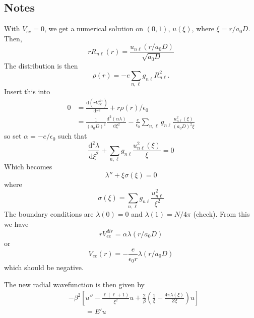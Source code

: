\documentclass[twocolumn]{article}
\begin{document}
\begin{large}
\subsection*{Notes}
With $V_{ee}=0$, we get a numerical solution on $(0,1)$, $u(\xi)$, where $\xi = r/a_0D$. Then,
\begin{equation}
    rR_{n\ell}(r) = \frac{u_{n\ell}(r/a_0D)}{\sqrt{a_0D}}
\end{equation}
The distribution is then 
\begin{equation}
    \rho(r) = -e\sum_{n,\ell}g_{n\ell}R_{n\ell}^2.
\end{equation}
Insert this into 
\begin{equation}
    \begin{split}
        0 &= \frac{\text{d}(rV_{ee}^{dir})}{\text{d}r^2} + r\rho(r)/\epsilon_0  \\ 
        &= \frac{1}{(a_0D)^2}\frac{\text{d}^2(\alpha\lambda)}{\text{d}\xi^2} - \frac{e}{\epsilon_0}\sum_{n,\ell}g_{n\ell}\frac{u_{n\ell}^2(\xi)}{(a_0D)^2\xi}
    \end{split}
\end{equation}
so set $\alpha=-e/\epsilon_0$ such that
\begin{equation}
    \frac{\text{d}^2\lambda}{\text{d}\xi^2} + \sum_{n,\ell}g_{n\ell}\frac{u_{n\ell}^2(\xi)}{\xi} = 0
\end{equation}
Which becomes 
\begin{equation}
    \lambda'' + \xi\sigma(\xi) = 0
\end{equation}
where 
\begin{equation}
    \sigma(\xi) = \sum_{n,\ell} g_{n\ell}\frac{u^2_{n\ell}}{\xi^2}
\end{equation}
The boundary conditions are $\lambda(0) = 0$ and $\lambda(1) = N/4\pi$ (check). From this we have
\begin{equation}
    rV_{ee}^{dir} = \alpha\lambda(r/a_0D)
\end{equation}
or 
\begin{equation}
    V_{ee}(r) = -\frac{e}{\epsilon_0r}\lambda(r/a_0D)
\end{equation}
which should be negative.

The new radial wavefunction is then given by
\begin{equation}
    \begin{split}
        &-\beta^2\left[u'' - \frac{\ell(\ell+1)}{\xi^2}u + \frac{2}{\beta}\left(\frac{1}{\xi}-\frac{4\pi\lambda(\xi)}{Z\xi}\right)u\right] \\ 
        &\hspace{1cm}= E'u
    \end{split}
\end{equation}


\end{large}
\end{document}
